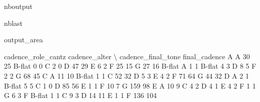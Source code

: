 \documentclass[letterpaper,10pt,english]{sphinxmanual}
\begin{document}
\begin{sphinxuseclass}{nboutput}
\begin{sphinxuseclass}{nblast}
{\begin{sphinxuseclass}{output_area}
\begin{sphinxuseclass}{}
\begin{sphinxVerbatim}[commandchars=\\\{\}]
                                  cadence\_role\_cantz  cadence\_alter  \textbackslash{}
cadence\_final\_tone final\_cadence
A                  A                              30             25
                   B-flat                          0              0
                   C                               2              0
                   D                              47             29
                   E                               6              2
                   F                              25             15
                   G                              27             16
B-flat             A                               1              1
                   B-flat                          4              3
                   D                               8              5
                   F                               2              2
                   G                              68             45
C                  A                              11             10
                   B-flat                          1              1
                   C                              52             32
                   D                               5              3
                   E                               4              2
                   F                              71             64
                   G                              44             32
D                  A                               2              1
                   B-flat                          5              5
                   C                               1              0
                   D                              85             56
                   E                               1              1
                   F                              10              7
                   G                             159             98
E                  A                              10              9
                   C                               4              2
                   D                               4              1
                   E                               4              2
                   F                               1              1
                   G                               6              3
F                  B-flat                          1              1
                   C                               9              3
                   D                              14             11
                   E                               1              1
                   F                             136            104

\end{sphinxVerbatim}
\end{sphinxuseclass}
\end{sphinxuseclass}}
\end{sphinxuseclass}
\end{sphinxuseclass}
\end{document}
